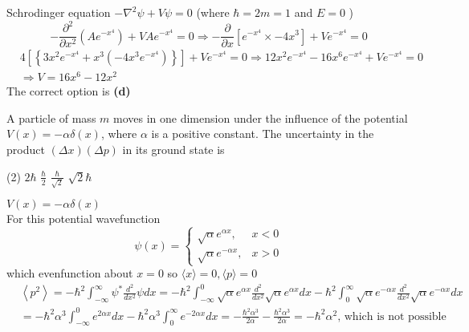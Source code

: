 \begin{enumerate}
\begin{tasks}
\end{tasks}
\begin{answer}
	 Schrodinger equation
	$-\nabla^{2} \psi+V \psi=0$ (where $\hbar=2 m=1$ and $E=0$ )
	$$
	-\frac{\partial^{2}}{\partial x^{2}}\left(A e^{-x^{4}}\right)+V A e^{-x^{4}}=0 \Rightarrow-\frac{\partial}{\partial x}\left[e^{-x^{4}} \times-4 x^{3}\right]+V e^{-x^{4}}=0
	$$
	\begin{align*}
		&4\left[\left\{3 x^{2} e^{-x^{4}}+x^{3}\left(-4 x^{3} e^{-x^{4}}\right)\right\}\right]+V e^{-x^{4}}=0 \Rightarrow 12 x^{2} e^{-x^{4}}-16 x^{6} e^{-x^{4}}+V e^{-x^{4}}=0 \\
		&\Rightarrow V=16 x^{6}-12 x^{2}
	\end{align*}
	The correct option is \textbf{(d)}
\end{answer}
\begin{minipage}{\textwidth}
	\item A particle of mass $m$ moves in one dimension under the influence of the potential $V(x)=-\alpha \delta(x)$, where $\alpha$ is a positive constant. The uncertainty in the product $(\Delta x)(\Delta p)$ in its ground state is
\end{minipage}
\begin{tasks}(2)
	\task[\textbf{A.}] $2 \hbar$
	\task[\textbf{B.}]$\frac{\hbar}{2}$
	\task[\textbf{C.}]$\frac{\hbar}{\sqrt{2}}$
	\task[\textbf{D.}]$\sqrt{2} \hbar$
\end{tasks}
\begin{answer}
	$V(x)=-\alpha \delta(x)$\\
	For this potential wavefunction
	$$
	\psi(x)= \begin{cases}\sqrt{\alpha} e^{\alpha x}, & x<0 \\ \sqrt{\alpha} e^{-\alpha x}, & x>0\end{cases}
	$$
	which evenfunction about $x=0$
	so $\langle x\rangle=0,\langle p\rangle=0$\\
	\begin{align*}
		&\left\langle p^{2}\right\rangle=-\hbar^{2} \int_{-\infty}^{\infty} \psi^{*} \frac{d^{2}}{d x^{2}} \psi d x=-\hbar^{2} \int_{-\infty}^{0} \sqrt{\alpha} e^{\alpha x} \frac{d^{2}}{d x^{2}} \sqrt{\alpha} e^{\alpha x} d x-\hbar^{2} \int_{0}^{\infty} \sqrt{\alpha} e^{-\alpha x} \frac{d^{2}}{d x^{2}} \sqrt{\alpha} e^{-\alpha x} d x \\
		&=-\hbar^{2} \alpha^{3} \int_{-\infty}^{0} e^{2 \alpha x} d x-\hbar^{2} \alpha^{3} \int_{0}^{\infty} e^{-2 \alpha x} d x=-\frac{\hbar^{2} \alpha^{3}}{2 \alpha}-\frac{\hbar^{2} \alpha^{3}}{2 \alpha}=-\hbar^{2} \alpha^{2} \text {, which is not possible }

\end{align*}
\end{answer}
\end{enumerate}
